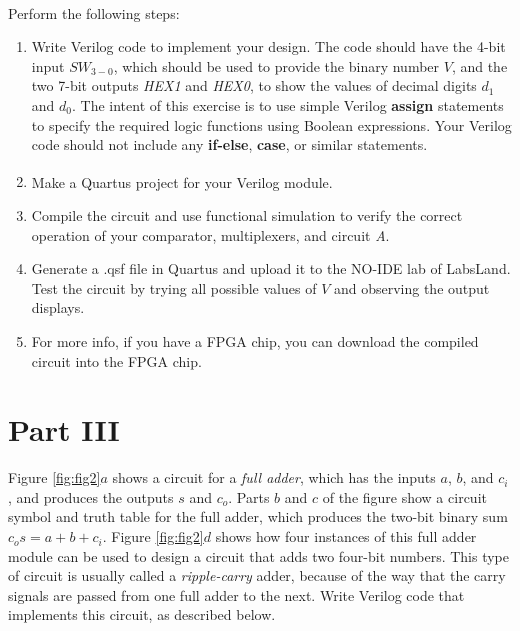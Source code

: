 \documentclass[epsfig,10pt,fullpage]{article}
\begin{document}
~\\
Perform the following steps:
\begin{enumerate}
\item Write Verilog code to implement your design. The code
should have the 4-bit input $SW_{3-0}$, which should be
used to provide the binary number $V$, and the two 7-bit outputs {\it HEX1} and {\it HEX0},
to show the values of decimal digits $d_1$ and $d_0$. 
The intent of this exercise is to use simple Verilog {\bf assign}
statements to specify the required logic functions using Boolean
expressions. Your Verilog code should not include any {\bf if-else}, {\bf case}, or
similar statements. 
\item Make a Quartus\textsuperscript{\textregistered} project for your Verilog module.
\item Compile the circuit and use functional simulation to verify the correct operation of
your comparator, multiplexers, and circuit {\it A}.
\item Generate a .qsf file in Quartus and upload it to the NO-IDE lab of LabsLand. Test the circuit by trying all possible 
values of $V$ and observing the output displays.
\item For more info, if you have a FPGA chip, you can download the compiled circuit into the FPGA chip.
\end{enumerate}

\section*{Part III}
Figure \ref{fig:fig2}$a$ shows a circuit for a {\it full adder}, 
which has the inputs $a$, $b$, and $c_i$,
and produces the outputs $s$ and $c_o$. Parts $b$ and $c$ of the figure show a circuit
symbol and truth table for the full adder, which produces the two-bit binary sum
$c_o s = a + b + c_i$. Figure \ref{fig:fig2}$d$ shows how four instances of this full adder module
can be used to design a circuit that adds two four-bit numbers. This type of circuit is
usually called a {\it ripple-carry} adder, because of the way that the carry signals are 
passed from one full adder to the next. Write Verilog code that implements this circuit,
as described below.
\end{document}
